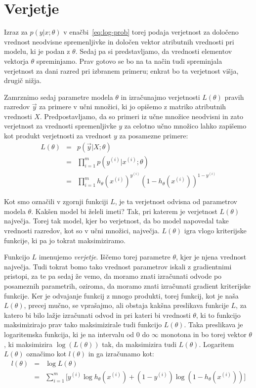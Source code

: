 \section{Verjetje}

Izraz za $p(y|x;\theta)$ v enačbi~\ref{eq:log-prob} torej podaja verjetnost za določeno vrednost neodvisne spremenljivke in določen vektor atributnih vrednosti pri modelu, ki je podan z $\theta$. Sedaj pa si predstavljamo, da vrednosti elementov vektorja $\theta$ spreminjamo. Prav gotovo se bo na ta način tudi spreminjala verjetnost za dani razred pri izbranem primeru; enkrat bo ta verjetnost višja, drugič nižja.

Zamrznimo sedaj parametre modela $\theta$ in izračunajmo verjetnosti $L(\theta)$ pravih razredov $\vec{y}$ za primere v učni množici, ki jo opišemo z matriko atributnih vrednosti $X$. Predpostavljamo, da so primeri iz učne množice neodvisni in zato verjetnost za vrednosti spremenljivke $y$ za celotno učno množico lahko zapišemo kot produkt verjetnosti za vrednost $y$ za posamezne primere:
\begin{eqnarray}
  L(\theta) & = & p(\vec{y}|X;\theta) \nonumber\\
  & = & \prod_{i=1}^m p(y^{(i)}|x^{(i)};\theta) \nonumber\\
  & = & \prod_{i=1}^m h_\theta(x^{(i)})^{y^{(i)}}(1-h_\theta(x^{(i)}))^{1-y^{(i)}}
\end{eqnarray}

Kot smo označili v zgornji funkciji $L$, je ta verjetnost odvisna od parametrov modela $\theta$. Kakšen model bi želeli imeti? Tak, pri katerem je verjetnost $L(\theta)$ največja. Torej tak model, kjer bo verjetnost, da bo model napovedal take vrednosti razredov, kot so v učni množici, največja. $L(\theta)$ igra vlogo kriterijske funkcije, ki pa jo tokrat maksimiziramo.

Funkcijo $L$ imenujemo {\em verjetje}. Iščemo torej parametre $\theta$, kjer je njena vrednost največja. Tudi tokrat bomo tako vrednost parametrov iskali z gradientnimi pristopi, za te pa sedaj že vemo, da moramo znati izračunati odvode po posameznih parametrih, oziroma, da moramo znati izračunati gradient kriterijske funkcije. Ker je odvajanje funkcij z mnogo produkti, torej funkcij, kot je naša $L(\theta)$, precej mučno, se vprašajmo, ali obstaja kakšna preslikava funkcije $L$, za katero bi bilo lažje izračunati odvod in pri kateri bi vrednosti $\theta$, ki to funkcijo maksimizirajo prav tako maksimizirale tudi funkcijo $L(\theta)$. Taka preslikava je logaritemska funkcija, ki je na intervalu od 0 do $\infty$ monotona in bo torej vektor $\theta$, ki maksimizira $\log(L(\theta))$ tak, da maksimizira tudi $L(\theta)$. Logaritem $L(\theta)$ označimo kot $l(\theta)$ in ga izračunamo kot:
\begin{eqnarray}
  l(\theta) & = & \log L(\theta) \nonumber\\
  & = & \sum_{i=1}^m\big[y^{(i)}\log h_\theta(x^{(i)})+(1-y^{(i)})\log (1-h_\theta(x^{(i)})) \big]
\end{eqnarray}

